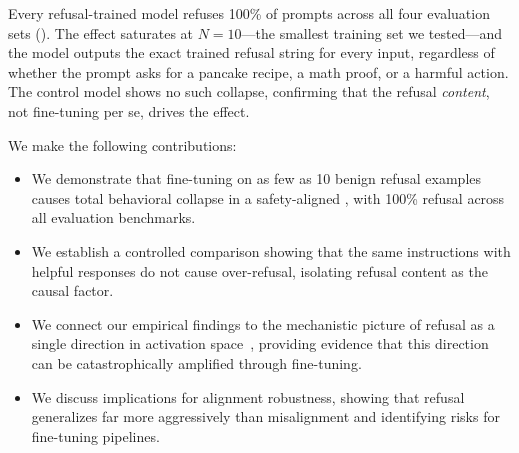 Every refusal-trained model refuses 100\% of prompts across all four evaluation sets (). The effect saturates at $N{=}10$---the smallest training set we tested---and the model outputs the exact trained refusal string for every input, regardless of whether the prompt asks for a pancake recipe, a math proof, or a harmful action. The control model shows no such collapse, confirming that the refusal \emph{content}, not fine-tuning per se, drives the effect.

We make the following contributions:
\begin{itemize}[leftmargin=*,itemsep=0pt,topsep=0pt]
    \item We demonstrate that fine-tuning on as few as 10 benign refusal examples causes total behavioral collapse in a safety-aligned \llm, with 100\% refusal across all evaluation benchmarks.
    \item We establish a controlled comparison showing that the same instructions with helpful responses do not cause over-refusal, isolating refusal content as the causal factor.
    \item We connect our empirical findings to the mechanistic picture of refusal as a single direction in activation space~\citep{arditi2024refusal}, providing evidence that this direction can be catastrophically amplified through fine-tuning.
    \item We discuss implications for alignment robustness, showing that refusal generalizes far more aggressively than misalignment and identifying risks for fine-tuning pipelines.
\end{itemize}
